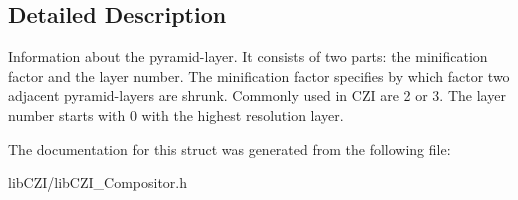 \subsection{Detailed Description}
Information about the pyramid-\/layer. It consists of two parts\+: the minification factor and the layer number. The minification factor specifies by which factor two adjacent pyramid-\/layers are shrunk. Commonly used in C\+ZI are 2 or 3. The layer number starts with 0 with the highest resolution layer. 

The documentation for this struct was generated from the following file\+:\begin{DoxyCompactItemize}
\item 
lib\+C\+Z\+I/lib\+C\+Z\+I\+\_\+\+Compositor.\+h\end{DoxyCompactItemize}
